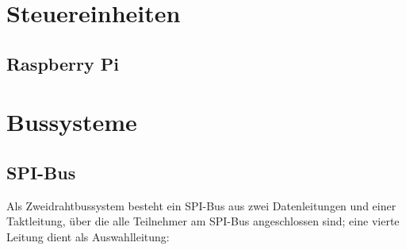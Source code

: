 

\section{Steuereinheiten}

\subsection{Raspberry Pi}

\newpage

\section{Bussysteme}

\subsection{SPI-Bus}

Als Zweidrahtbussystem besteht ein SPI-Bus aus zwei Datenleitungen und einer Taktleitung, über die alle Teilnehmer am SPI-Bus angeschlossen sind; eine vierte Leitung dient als Auswahlleitung:

